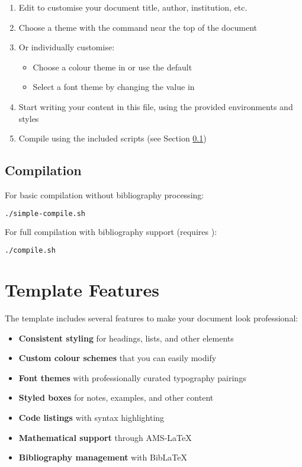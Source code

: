 \documentclass[a4paper,11pt]{article}
\begin{document}
\begin{enumerate}
    \item Edit  to customise your document title, author, institution, etc.
    \item Choose a theme with the  command near the top of the document
    \item Or individually customise:
    \begin{itemize}
        \item Choose a colour theme in  or use the default
        \item Select a font theme by changing the \inlinecode{\\fonttheme} value in 
    \end{itemize}
    \item Start writing your content in this file, using the provided environments and styles
    \item Compile using the included scripts (see Section \ref{sec:compilation})
\end{enumerate}

\subsection{Compilation}
\label{sec:compilation}
For basic compilation without bibliography processing:

\begin{lstlisting}[language=bash]
./simple-compile.sh
\end{lstlisting}

For full compilation with bibliography support (requires ):

\begin{lstlisting}[language=bash]
./compile.sh
\end{lstlisting}

\section{Template Features}
The template includes several features to make your document look professional:

\begin{itemize}
    \item \textbf{Consistent styling} for headings, lists, and other elements
    \item \textbf{Custom colour schemes} that you can easily modify
    \item \textbf{Font themes} with professionally curated typography pairings
    \item \textbf{Styled boxes} for notes, examples, and other content
    \item \textbf{Code listings} with syntax highlighting
    \item \textbf{Mathematical support} through AMS-LaTeX
    \item \textbf{Bibliography management} with BibLaTeX
\end{itemize}
\end{document}
